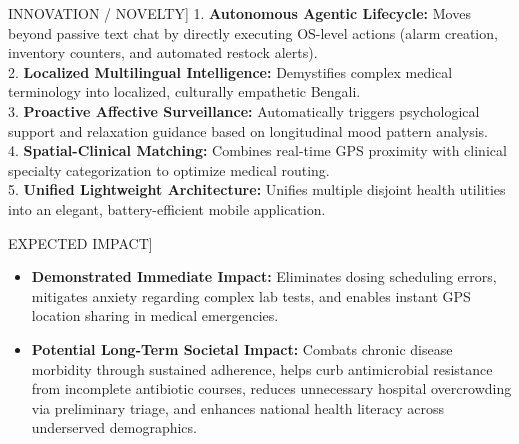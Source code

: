 \documentclass[12pt,a4paper,oneside]{report}
\begin{document}
\begin{highlightbox}[title=[FIELD 5] INNOVATION / NOVELTY]
1. \textbf{Autonomous Agentic Lifecycle:} Moves beyond passive text chat by directly executing OS-level actions (alarm creation, inventory counters, and automated restock alerts).\\
2. \textbf{Localized Multilingual Intelligence:} Demystifies complex medical terminology into localized, culturally empathetic Bengali.\\
3. \textbf{Proactive Affective Surveillance:} Automatically triggers psychological support and relaxation guidance based on longitudinal mood pattern analysis.\\
4. \textbf{Spatial-Clinical Matching:} Combines real-time GPS proximity with clinical specialty categorization to optimize medical routing.\\
5. \textbf{Unified Lightweight Architecture:} Unifies multiple disjoint health utilities into an elegant, battery-efficient mobile application.
\end{highlightbox}

\begin{highlightbox}[title=[FIELD 6] EXPECTED IMPACT]
\begin{itemize}
    \item \textbf{Demonstrated Immediate Impact:} Eliminates dosing scheduling errors, mitigates anxiety regarding complex lab tests, and enables instant GPS location sharing in medical emergencies.
    \item \textbf{Potential Long-Term Societal Impact:} Combats chronic disease morbidity through sustained adherence, helps curb antimicrobial resistance from incomplete antibiotic courses, reduces unnecessary hospital overcrowding via preliminary triage, and enhances national health literacy across underserved demographics.
\end{itemize}
\end{highlightbox}
\end{document}
